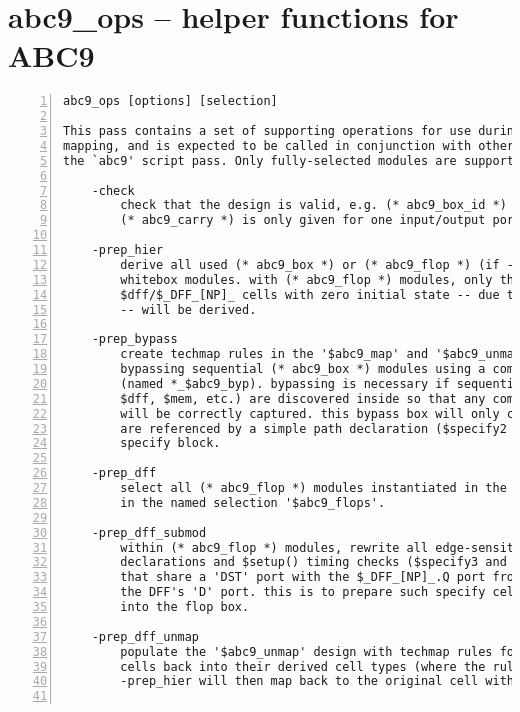 \section{abc9\_ops -- helper functions for ABC9}
\label{cmd:abc9_ops}
\begin{lstlisting}[numbers=left,frame=single]
    abc9_ops [options] [selection]

This pass contains a set of supporting operations for use during ABC technology
mapping, and is expected to be called in conjunction with other operations from
the `abc9' script pass. Only fully-selected modules are supported.

    -check
        check that the design is valid, e.g. (* abc9_box_id *) values are unique,
        (* abc9_carry *) is only given for one input/output port, etc.

    -prep_hier
        derive all used (* abc9_box *) or (* abc9_flop *) (if -dff option)
        whitebox modules. with (* abc9_flop *) modules, only those containing
        $dff/$_DFF_[NP]_ cells with zero initial state -- due to an ABC limitation
        -- will be derived.

    -prep_bypass
        create techmap rules in the '$abc9_map' and '$abc9_unmap' designs for
        bypassing sequential (* abc9_box *) modules using a combinatorial box
        (named *_$abc9_byp). bypassing is necessary if sequential elements (e.g.
        $dff, $mem, etc.) are discovered inside so that any combinatorial paths
        will be correctly captured. this bypass box will only contain ports that
        are referenced by a simple path declaration ($specify2 cell) inside a
        specify block.

    -prep_dff
        select all (* abc9_flop *) modules instantiated in the design and store
        in the named selection '$abc9_flops'.

    -prep_dff_submod
        within (* abc9_flop *) modules, rewrite all edge-sensitive path
        declarations and $setup() timing checks ($specify3 and $specrule cells)
        that share a 'DST' port with the $_DFF_[NP]_.Q port from this 'Q' port to
        the DFF's 'D' port. this is to prepare such specify cells to be moved
        into the flop box.

    -prep_dff_unmap
        populate the '$abc9_unmap' design with techmap rules for mapping *_$abc9_flop
        cells back into their derived cell types (where the rules created by
        -prep_hier will then map back to the original cell with parameters).


\end{lstlisting}
